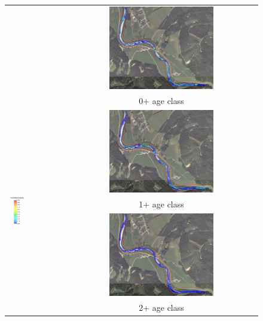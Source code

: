 \centering
\begin{figure}[h!]                                                   	%
	\begin{tabular}{ l  c }
		
		& \includegraphics[width=0.56\textwidth,valign=t]{images/0_0035}\\
		& 0+ age class\\
		\multirow{4}{*}{\includegraphics[width=0.3\textwidth,valign=t]{images/suitability_index}}& \includegraphics[width=0.56\textwidth,valign=t]{images/1_0035}\\
		& 1+ age class\\
		& \includegraphics[width=0.56\textwidth,valign=t]{images/2_0035}\\
		& 2+ age class
		

\end{tabular}
\end{figure}
